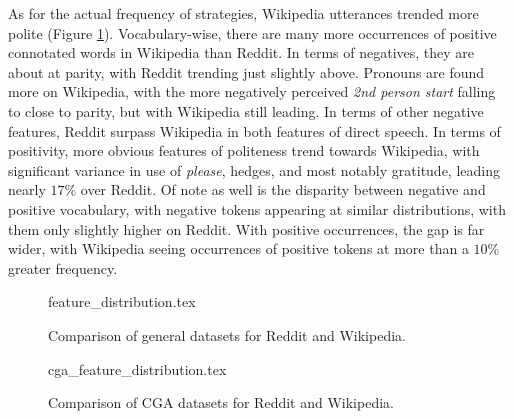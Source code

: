 \documentclass{article}
\begin{document}
As for the actual frequency of strategies, Wikipedia utterances trended more polite (Figure \ref{fig:reddit_wiki_FD}). Vocabulary-wise, there are many more occurrences of positive connotated words in Wikipedia than Reddit. In terms of negatives, they are about at parity, with Reddit trending just slightly above. Pronouns are found more on Wikipedia, with the more negatively perceived \textit{2nd person start} falling to close to parity, but with Wikipedia still leading. In terms of other negative features, Reddit surpass Wikipedia in both features of direct speech. In terms of positivity, more obvious features of politeness trend towards Wikipedia, with significant variance in use of \textit{please}, hedges, and most notably gratitude, leading nearly $17\%$ over Reddit. Of note as well is the disparity between negative and positive vocabulary, with negative tokens appearing at similar distributions, with them only slightly higher on Reddit. With positive occurrences, the gap is far wider, with Wikipedia seeing occurrences of positive tokens at more than a $10\%$ greater frequency.

\begin{figure}
    \centering
    \caption{Comparison of general datasets for Reddit and Wikipedia.}
    \begin{adjustbox}{center,scale=0.9,margin={0cm,0cm,0cm,0cm}}
    {feature_distribution.tex}
    \end{adjustbox}
    \label{fig:reddit_wiki_FD}
\end{figure}

\begin{figure}
    \centering
    \caption{Comparison of CGA datasets for Reddit and Wikipedia.}
    \begin{adjustbox}{center,scale=0.9,margin={0cm,0cm,0cm,0cm}}
    {cga_feature_distribution.tex}
    \end{adjustbox}
    \label{fig:cga_reddit_wiki_FD}
\end{figure}
\end{document}
